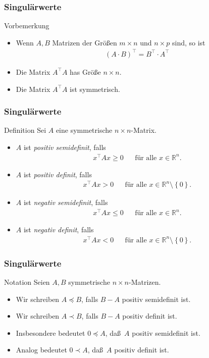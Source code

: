 \documentclass{beamer}
\title[Linadi]{\mytitle}
\author[Amin Coja-Oghlan]{Amin Coja-Oghlan}
\institute[Frankfurt]{JWGUFFM}
\date{}
\renewcommand{\emph}[1]{{\textcolor{solarizedRed}{\itshape #1}}}
\newcommand\RR{\mathbb R}
\newcommand\cbc[1]{\left\{{#1}\right\}}
\newcommand{\trans}{\top}
\renewcommand{\ae}{\"a}
\renewcommand{\oe}{\"o}
\newcommand{\ue}{\"u}
\newcommand{\mytitle}{Singul\ae rwerte}
\begin{document}
\frame[plain]{\titlepage}

\begin{frame}\frametitle{\mytitle}
	\begin{block}{Vorbemerkung}
		\begin{itemize}
			\item Wenn $A,B$ Matrizen der Gr\oe\ss en $m\times n$ und $n\times p$ sind, so ist
				\begin{align*}
					(A\cdot B)^\trans=B^\trans\cdot A^\trans
				\end{align*}
			\item Die Matrix $A^\trans A$ has Gr\oe\ss e $n\times n$.
			\item Die Matrix $A^\trans A$ ist symmetrisch.
		\end{itemize}
	\end{block}
\end{frame}

\begin{frame}\frametitle{\mytitle}
	\begin{block}{Definition}
		Sei $A$ eine symmetrische $n\times n$-Matrix.
		\begin{itemize}
			\item $A$ ist \emph{positiv semidefinit}, falls
				\begin{align*}
					x^\trans Ax\geq0&&\mbox{f\ue r alle }x\in\RR^n.
				\end{align*}
			\item $A$ ist \emph{positiv definit}, falls
				\begin{align*}
					x^\trans Ax>0&&\mbox{f\ue r alle }x\in\RR^n\setminus\cbc 0.
				\end{align*}
			\item $A$ ist \emph{negativ semidefinit}, falls
				\begin{align*}
					x^\trans Ax\leq0&&\mbox{f\ue r alle }x\in\RR^n.
				\end{align*}
			\item $A$ ist \emph{negativ definit}, falls
				\begin{align*}
					x^\trans Ax<0&&\mbox{f\ue r alle }x\in\RR^n\setminus\cbc 0.
				\end{align*}
		\end{itemize}
	\end{block}
\end{frame}

\begin{frame}\frametitle{\mytitle}
	\begin{block}{Notation}
		Seien $A,B$ symmetrische $n\times n$-Matrizen.
		\begin{itemize}
			\item Wir schreiben $A\preceq B$, falls $B-A$ positiv semidefinit ist.
			\item Wir schreiben $A\prec B$, falls $B-A$ positiv definit ist.
			\item Insbesondere bedeutet $0\preceq A$, da\ss\ $A$ positiv semidefinit ist.
			\item Analog bedeutet $0\prec A$, da\ss\ $A$ positiv definit ist.
		\end{itemize}
	\end{block}
\end{frame}
\end{document}
